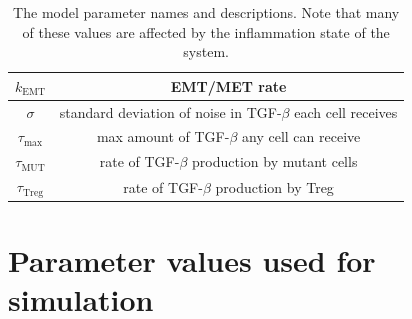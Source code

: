\documentclass[11pt, a4paper, preprint]{article}
\begin{document}
\begin{table}[H]
\begin{center}
\begin{tabular}{| c | c|}
  $k_\text{EMT}$ & EMT/MET rate  \\
  \hline
  $\sigma$ & standard deviation of noise in TGF-$\beta$ each cell receives  \\
  \hline
 $\tau_\text{max}$ & max amount of TGF-$\beta$ any cell can receive \\
  \hline 
 $\tau_\text{MUT}$ & rate of TGF-$\beta$ production by mutant cells\\
  \hline
 $\tau_\text{Treg}$ & rate of TGF-$\beta$ production by Treg\\
  \hline
\end{tabular}
  \caption{The model parameter names and descriptions. Note that many of these values are affected by the inflammation state of the system.}
\end{center}
\end{table}

\newpage
\section{Parameter values used for simulation}
\end{document}
